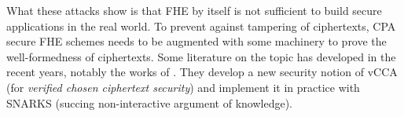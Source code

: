 What these attacks show is that FHE by itself is not sufficient to build secure applications in the real world. To prevent against tampering of ciphertexts, \textsf{CPA} secure FHE schemes needs to be augmented with some machinery to prove the well-formedness of ciphertexts. Some literature on the topic has developed in the recent years, notably the works of \cite{EC:ManNgu24, CiC:BCFPPR25}. They develop a new security notion of \textsf{vCCA} (for \textit{verified chosen ciphertext security}) and implement it in practice with SNARKS \cite{SNARKS} (succing non-interactive argument of knowledge). 


